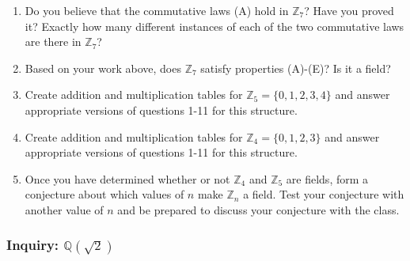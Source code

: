 \documentclass[11pt]{article}
\newenvironment{task}
	{\begin{mdframed}[linecolor=lightgray, linewidth=3pt]\raggedright}
	{\end{mdframed}}
\theoremstyle{definition}
\begin{document}
\begin{task}
\begin{enumerate}
        \vspace{1.5in}

      \item Do you believe that the commutative laws (A) hold in $\mathbb{Z}_7$? Have you proved it? Exactly how many different 
        instances of each of the two commutative laws are there in $\mathbb{Z}_7$?

        \vspace{1.5in}

      \item Based on your work above, does $\mathbb{Z}_7$ satisfy properties (A)-(E)? Is it a field?

        \vspace{1.5in}

        \newpage 
      \item Create addition and multiplication tables for $\mathbb{Z}_5 = \{0,1,2,3,4\}$ and answer
        appropriate versions of questions 1-11 for this structure. 

        \newpage
      \item Create addition and multiplication tables for $\mathbb{Z}_4 = \{0,1,2,3\}$ and answer
        appropriate versions of questions 1-11 for this structure. 
        \newpage


      \item Once you have determined whether or not $\mathbb{Z}_4$ and $\mathbb{Z}_5$ are fields, form a conjecture about which values of $n$ make
        $\mathbb{Z}_n$ a field. Test your conjecture with another value of $n$ and be prepared to discuss your conjecture with the class.

        \newpage
    \end{enumerate}
  \end{task}

    \newpage \subsubsection{Inquiry: $\mathbb{Q}(\sqrt{2})$}
\end{document}
